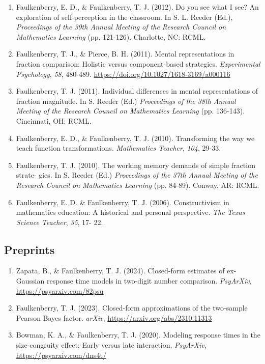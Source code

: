 \documentclass[article,10pt]{article}
\begin{document}
\begin{enumerate}
\item Faulkenberry, E. D., \& Faulkenberry, T. J. (2012). Do you see what I see? An exploration of self-perception in the classroom. In S. L. Reeder (Ed.), \emph{Proceedings of the 39th Annual Meeting of the Research Council on Mathematics Learning} (pp. 121-126). Charlotte, NC: RCML.
\item Faulkenberry, T. J., \& Pierce, B. H. (2011). Mental representations in fraction comparison: Holistic versus component-based strategies. \emph{Experimental Psychology}, \emph{58}, 480-489. \url{https://doi.org/}\href{http://dx.doi.org/10.1027/1618-3169/a000116}{10.1027/1618-3169/a000116}
\item Faulkenberry, T. J. (2011). Individual differences in mental representations of fraction magnitude. In S. Reeder (Ed.) \emph{Proceedings of the 38th Annual Meeting of the Research Council on Mathematics Learning} (pp. 136-143). Cincinnati, OH: RCML.
\item Faulkenberry, E. D., \& Faulkenberry, T. J. (2010). Transforming the way we teach function transformations. \emph{Mathematics Teacher}, \emph{104}, 29-33.
\item Faulkenberry, T. J. (2010). The working memory demands of simple fraction strate- gies. In S. Reeder (Ed.) \emph{Proceedings of the 37th Annual Meeting of the Research Council on Mathematics Learning} (pp. 84-89). Conway, AR: RCML.
\item Faulkenberry, E. D. \& Faulkenberry, T. J. (2006). Constructivism in mathematics education: A historical and personal perspective. \emph{The Texas Science Teacher}, \emph{35}, 17- 22.
\end{enumerate}

\subsection*{Preprints}
\label{sec:org51f84af}
\begin{enumerate}
\item Zapata, B., \& Faulkenberry, T. J. (2024). Closed-form estimates of ex-Gaussian response time models in two-digit number comparison. \emph{PsyArXiv}, \url{https://psyarxiv.com/82psu}
\item Faulkenberry, T. J. (2023). Closed-form approximations of the two-sample Pearson Bayes factor. \emph{arXiv}, \url{https://arxiv.org/abs/2310.11313}
\item Bowman, K. A., \& Faulkenberry, T. J. (2020). Modeling response times in the size-congruity effect: Early versus late interaction. \emph{PsyArXiv}, \url{https://psyarxiv.com/dns4t/}
\end{enumerate}
\end{document}
